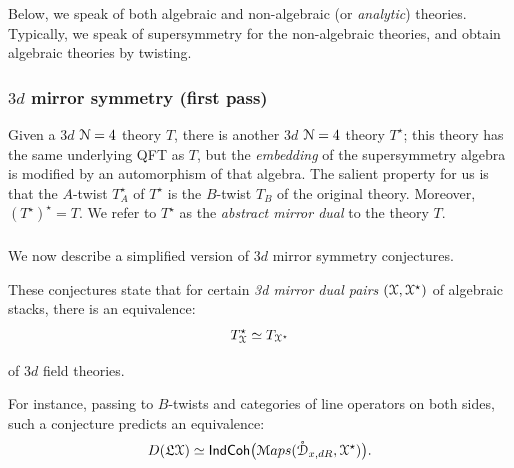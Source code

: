 \documentclass[reqno,11pt]{amsart}
\numberwithin{equation}{subsection}
\theoremstyle{remark}
\newcommand{\bB}{{\mathbb B}}
\newcommand{\sD}{{\EuScript D}}
\newcommand{\sM}{{\EuScript M}}
\newcommand{\sN}{{\EuScript N}}
\newcommand{\sX}{{\EuScript X}}
\newcommand{\fL}{{\mathfrak L}}
\newcommand{\IndCoh}{\mathsf{IndCoh}}
\newcommand{\Maps}{\sM aps}
\renewcommand{\o}[1]{\mathring{#1}}
\begin{document}
\subsubsection{} Below, we speak of both algebraic and non-algebraic (or \emph{analytic})
theories. Typically, we speak of supersymmetry for the non-algebraic theories, 
and obtain algebraic theories by twisting. 

\subsubsection{$3d$ mirror symmetry (first pass)}

Given a $3d$ $\sN = 4$ theory $T$, there is another $3d$ $\sN = 4$ 
theory $T^{\star}$; this theory has the same underlying QFT as $T$, but the
\emph{embedding} of the supersymmetry algebra is modified by an automorphism
of that algebra. The salient property for us is that the $A$-twist 
$T_A^{\star}$ of $T^{\star}$ is the $B$-twist $T_B$ of the original theory.
Moreover, $(T^{\star})^{\star} = T$. We refer to $T^{\star}$ as the
\emph{abstract mirror dual} to the theory $T$.

\subsubsection{}

We now describe a simplified version of $3d$ mirror symmetry conjectures.

These conjectures state that for certain \emph{3d mirror dual pairs} 
$(\sX,\sX^{\star})$ of algebraic stacks, there is
an equivalence:
%
\[
T_{\sX}^{\star} \simeq T_{\sX^{\star}}
\]

\noindent of $3d$ field theories.

For instance, passing to $B$-twists and categories of line operators on both sides, 
such a conjecture predicts an equivalence:
%
\[
D(\fL\sX) \simeq \IndCoh\big(\Maps(\o{\sD}_{x,dR},\sX^{\star})\big).
\]
\end{document}
